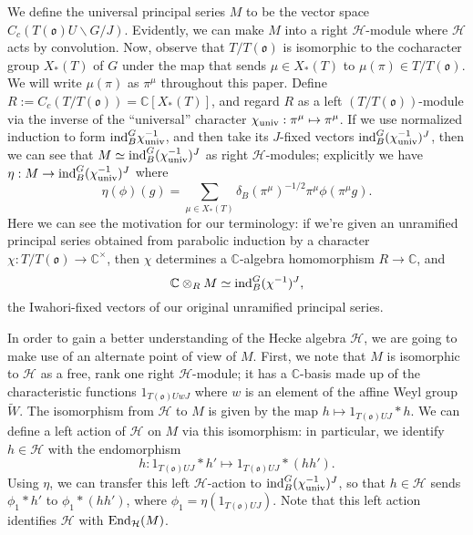 \documentclass[11pt,letterpaper]{article}
\newcommand{\C}{\mathbb{C}}
\newcommand{\calH}{\mathcal{H}} %
\newcommand{\bs}{\backslash}
\newcommand{\goth}{\mathfrak}
\newcommand{\End}{\textup{End}}
\newcommand{\ind}{\textup{ind}}
\theoremstyle{remark}
\numberwithin{equation}{section}
\begin{document}
We define the universal principal series $M$ to be the vector space $C_c(T(\goth{o})U\bs G / J)$. Evidently, we can make $M$ into a right $\calH$-module where $\calH$ acts by convolution. Now, observe that $T/T(\goth{o})$ is isomorphic to the cocharacter group $X_{\ast}(T)$ of $G$ under the map that sends $\mu \in X_{\ast}(T)$ to $\mu(\pi) \in T/T(\goth{o})$. We will write $\mu(\pi)$ as $\pi^{\mu}$ throughout this paper. Define $R := C_c(T/T(\goth{o})) = \C[X_{\ast}(T)]$, and regard $R$ as a left $(T/T(\goth{o}))$-module via the inverse of the ``universal'' character $\chi_{\textup{univ}}: \pi^{\mu} \mapsto \pi^{\mu}$. If we use normalized induction to form $\ind_B^G \chi_{\textup{univ}}^{-1}$, and then take its $J$-fixed vectors $\ind_B^G(\chi_{\textup{univ}}^{-1})^J$, then we can see that $M \simeq \ind_B^G(\chi_{\textup{univ}}^{-1})^J$ as right $\calH$-modules; explicitly we have $\eta: M \to \ind_B^G(\chi_{\textup{univ}}^{-1})^J$ where $$\eta(\phi)(g) = \sum_{\mu \in X_{\ast}(T)} \delta_B(\pi^{\mu})^{-1/2} \pi^{\mu} \phi(\pi^{\mu}g).$$ Here we can see the motivation for our terminology: if we're given an unramified principal series obtained from parabolic induction by a character $\chi: T/T(\goth{o}) \to \C^{\times}$, then $\chi$ determines a $\C$-algebra homomorphism $R \to \C$, and $$\C \otimes_R M \simeq \ind_B^G(\chi^{-1})^J,$$ the Iwahori-fixed vectors of our original unramified principal series.

In order to gain a better understanding of the Hecke algebra $\calH$, we are going to make use of an alternate point of view of $M$. First, we note that $M$ is isomorphic to $\calH$ as a free, rank one right $\calH$-module; it has a $\C$-basis made up of the characteristic functions $1_{T(\goth{o})UwJ}$ where $w$ is an element of the affine Weyl group $\widetilde{W}$. The isomorphism from $\calH$ to $M$ is given by the map $h \mapsto 1_{T(\goth{o})UJ} \ast h$. We can define a left action of $\calH$ on $M$ via this isomorphism: in particular, we identify $h \in \calH$ with the endomorphism $$h: 1_{T(\goth{o})UJ} \ast h' \mapsto 1_{T(\goth{o})UJ} \ast (hh').$$ Using $\eta$, we can transfer this left $\calH$-action to $\ind_B^G(\chi_{\textup{univ}}^{-1})^J$, so that $h \in \calH$ sends $\phi_1 \ast h'$ to $\phi_1 \ast (hh')$, where $\phi_1 = \eta(1_{T(\goth{o})UJ})$. Note that this left action identifies $\calH$ with $\End_{\calH}(M)$. 
\end{document}
